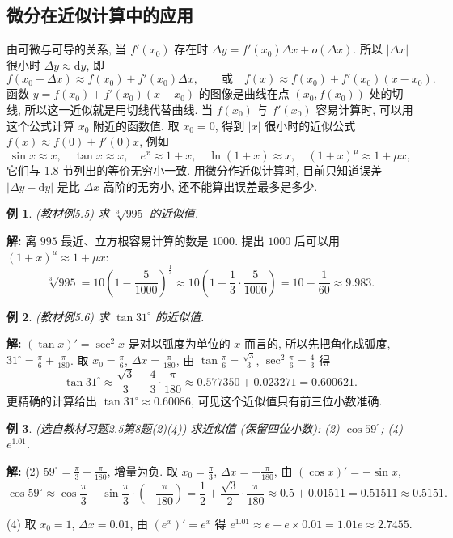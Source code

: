 \documentclass[UTF8,openany]{ctexbook}
\theoremstyle{chinesetextbook}
\newtheorem{example}{例}[section]
\newenvironment{cnsolution}{\par\indent\textbf{解:} \ignorespaces}{\par}
\newcommand{\dd}{\mathrm d}
\begin{document}
\subsection{微分在近似计算中的应用}
由可微与可导的关系, 当 $f'(x_0)$ 存在时 $\Delta y=f'(x_0)\Delta x+o(\Delta x)$. 所以 $|\Delta x|$ 很小时 $\Delta y\approx\dd y$, 即
\[
f(x_0+\Delta x)\approx f(x_0)+f'(x_0)\Delta x,\qquad\text{或}\quad f(x)\approx f(x_0)+f'(x_0)(x-x_0).
\]
函数 $y=f(x_0)+f'(x_0)(x-x_0)$ 的图像是曲线在点 $(x_0,f(x_0))$ 处的切线, 所以这一近似就是用切线代替曲线. 当 $f(x_0)$ 与 $f'(x_0)$ 容易计算时, 可以用这个公式计算 $x_0$ 附近的函数值. 取 $x_0=0$, 得到 $|x|$ 很小时的近似公式 $f(x)\approx f(0)+f'(0)x$, 例如
\[
\sin x\approx x,\quad\tan x\approx x,\quad e^x\approx1+x,\quad\ln(1+x)\approx x,\quad(1+x)^\mu\approx1+\mu x,
\]
它们与 1.8 节列出的等价无穷小一致. 用微分作近似计算时, 目前只知道误差 $|\Delta y-\dd y|$ 是比 $\Delta x$ 高阶的无穷小, 还不能算出误差最多是多少.
\begin{example}\label{ex:c2-5-5}
\textnormal{(教材例5.5)} 求 $\sqrt[3]{995}$ 的近似值.
\end{example}
\begin{cnsolution}
离 $995$ 最近、立方根容易计算的数是 $1000$. 提出 $1000$ 后可以用 $(1+x)^\mu\approx1+\mu x$:
\[
\sqrt[3]{995}=10\left(1-\frac5{1000}\right)^{\frac13}\approx10\left(1-\frac13\cdot\frac5{1000}\right)=10-\frac1{60}\approx9.983.
\]
\end{cnsolution}
\begin{example}\label{ex:c2-5-6}
\textnormal{(教材例5.6)} 求 $\tan31^\circ$ 的近似值.
\end{example}
\begin{cnsolution}
$(\tan x)'=\sec^2x$ 是对以弧度为单位的 $x$ 而言的, 所以先把角化成弧度, $\displaystyle31^\circ=\frac\pi6+\frac\pi{180}$. 取 $\displaystyle x_0=\frac\pi6$, $\displaystyle\Delta x=\frac\pi{180}$, 由 $\displaystyle\tan\frac\pi6=\frac{\sqrt3}3$, $\displaystyle\sec^2\frac\pi6=\frac43$ 得
\[
\tan31^\circ\approx\frac{\sqrt3}3+\frac43\cdot\frac\pi{180}\approx0.577350+0.023271=0.600621.
\]
更精确的计算给出 $\tan31^\circ\approx0.60086$, 可见这个近似值只有前三位小数准确.
\end{cnsolution}
\begin{example}\label{ex:c2-h5-8}
\textnormal{(选自教材习题2.5第8题(2)(4))} 求近似值 (保留四位小数): (2) $\cos59^\circ$; (4) $e^{1.01}$.
\end{example}
\begin{cnsolution}
(2) $\displaystyle59^\circ=\frac\pi3-\frac\pi{180}$, 增量为负. 取 $\displaystyle x_0=\frac\pi3$, $\displaystyle\Delta x=-\frac\pi{180}$, 由 $(\cos x)'=-\sin x$,
\[
\cos59^\circ\approx\cos\frac\pi3-\sin\frac\pi3\cdot\left(-\frac\pi{180}\right)=\frac12+\frac{\sqrt3}2\cdot\frac\pi{180}\approx0.5+0.01511=0.51511\approx0.5151.
\]

(4) 取 $x_0=1$, $\Delta x=0.01$, 由 $(e^x)'=e^x$ 得 $e^{1.01}\approx e+e\times0.01=1.01e\approx2.7455$.
\end{cnsolution}
\end{document}
